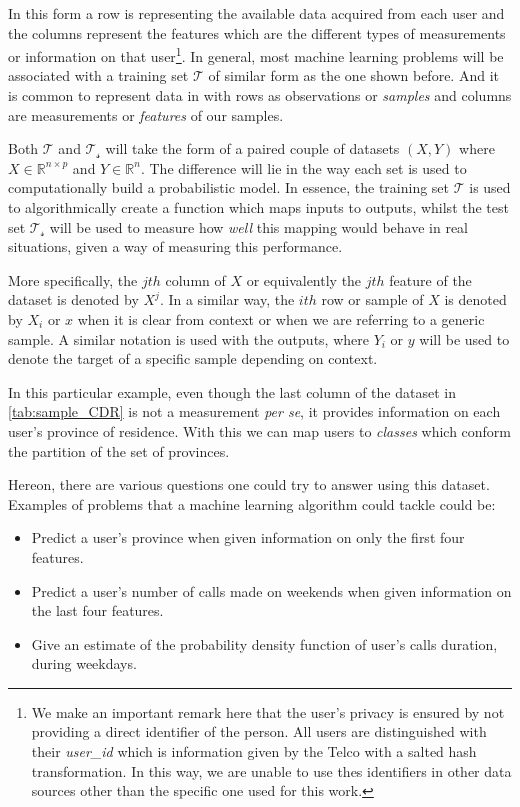 In this form a row is representing the available data acquired from each user and the columns represent the features which are the different types of measurements or information on that user\footnote{We make an important remark here that the user's privacy is ensured by not providing a direct identifier of the person.
All users are distinguished with their \textit{user\_id} which is information given by the Telco with a salted hash transformation. In this way, we are unable to use thes identifiers in other data sources other than the specific one used for this work.}.
In general, most machine learning problems will be associated with a training set $\mathcal{T}$ of similar form as the one shown before.
And it is common to represent data in with rows as observations or \textit{samples} and columns are measurements or \textit{features} of our samples.

Both $\mathcal{T}$ and $\mathcal{T_s}$ will take the form of a paired couple of datasets $(X,Y)$ where $X \in \mathbb{R}^{n \times p}$ and $Y \in \mathbb{R}^n $.
The difference will lie in the way each set is used to computationally build a probabilistic model.
In essence, the training set $\mathcal{T}$ is used to algorithmically create a function which maps inputs to outputs,  whilst the test set $\mathcal{T_s}$ will be used to measure how \textit{well} this mapping would behave in real situations, given a way of measuring this performance.

More specifically, the $jth$ column of $X$ or equivalently the $jth$ feature of the dataset is denoted by $X^j$.
In a similar way, the $ith$ row or sample of $X$ is denoted by $X_i$ or $x$ when it is clear from context or when we are referring to a generic sample.
A similar notation is used with the outputs, where $Y_i$ or $y$ will be used to denote the target of a specific sample depending on context.

In this particular example, even though the last column of the dataset in \cref{tab:sample_CDR} is not a measurement \textit{per se}, it provides information on each user's province of residence.
With this we can map users to \textit{classes} which conform the partition of the set of provinces.

Hereon, there are various questions one could try to answer using this dataset. Examples of problems that a machine learning algorithm could tackle could be:

\begin{itemize}
\item Predict a user's province when given information on only the first four features.
\item Predict a user's number of calls made on weekends when given information on the last four features.
\item Give an estimate of the probability density function of user's calls duration, during weekdays.
\end{itemize}

